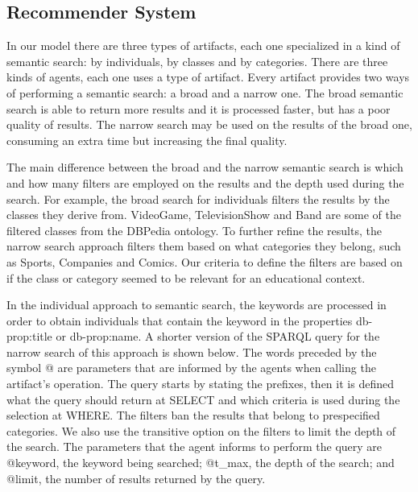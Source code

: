 \documentclass[a4paper,twoside]{article}
\begin{document}
\subsection{Recommender System}
\label{sec:recsys}

\noindent In our model there are three types of artifacts, each one specialized in a kind of semantic search: by individuals, by classes and by categories. There are three kinds of agents, each one uses a type of artifact. Every artifact provides two ways of performing a semantic search: a broad and a narrow one. The broad semantic search is able to return more results and it is processed faster, but has a poor quality of results. The narrow search may be used on the results of the broad one, consuming an extra time but increasing the final quality.

The main difference between the broad and the narrow semantic search is which and how many filters are employed on the results and the depth used during the search. For example, the broad search for individuals filters the results by the classes they derive from. VideoGame,  TelevisionShow and Band are some of the filtered classes from the DBPedia ontology. To further refine the results, the narrow search approach filters them based on what categories they belong, such as Sports, Companies and Comics. Our criteria to define the filters are based on if the class or category seemed to be relevant for an educational context.

In the individual approach to semantic search, the keywords are processed in order to obtain individuals that contain the keyword in the properties db-prop:title or db-prop:name. A shorter version of the SPARQL query for the narrow search of this approach is shown below. The words preceded by the symbol @ are parameters that are informed by the agents when calling the artifact's operation. The query starts by stating the prefixes, then it is defined what the query should return at SELECT and which criteria is used during the selection at WHERE. The filters ban the results that belong to prespecified categories. We also use the transitive option on the filters to limit the depth of the search. The parameters that the agent informs to perform the query are @keyword, the keyword being searched; @t\_max, the depth of the search; and @limit, the number of results returned by the query.
\end{document}
